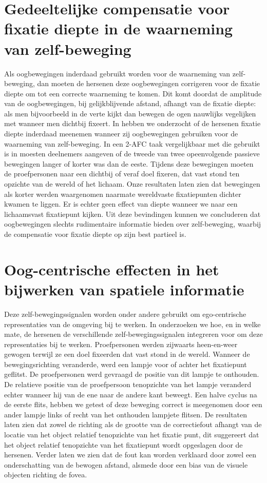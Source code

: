 \section{Gedeeltelijke compensatie voor fixatie diepte in de waarneming van zelf-beweging}
Als oogbewegingen inderdaad gebruikt worden voor de waarneming van zelf-beweging, dan moeten de hersenen deze oogbewegingen corrigeren voor de fixatie diepte om tot een correcte waarneming te komen. Dit komt doordat de amplitude van de oogbewegingen, bij gelijkblijvende afstand, afhangt van de fixatie diepte: als men bijvoorbeeld in de verte kijkt dan bewegen de ogen nauwlijks vegelijken met wanneer men dichtbij fixeert. In  hebben we onderzocht of de hersenen fixatie diepte inderdaad meenemen wanneer zij oogbewegingen gebruiken voor de waarneming van zelf-beweging. In een 2-AFC taak vergelijkbaar met die gebruikt is in  moesten deelnemers aangeven of de tweede van twee opeenvolgende passieve bewegingen langer of korter was dan de eeste. Tijdens deze bewegingen moeten de proefpersonen naar een dichtbij of veraf doel fixeren, dat vast stond ten opzichte van de wereld of het lichaam. Onze resultaten laten zien dat bewegingen als korter werden waargenomen naarmate wereldvaste fixatiepunten dichter kwamen te liggen. Er is echter geen effect van diepte wanneer we naar een lichaamsvast fixatiepunt kijken. Uit deze bevindingen kunnen we concluderen dat oogbewegingen slechts rudimentaire informatie bieden over zelf-beweging, waarbij de compensatie voor fixatie diepte op zijn best partieel is.

\section{Oog-centrische effecten in het bijwerken van spatiele informatie}
Deze zelf-bewegingssignalen worden onder andere gebruikt om ego-centrische representaties van de omgeving bij te werken. In  onderzoeken we hoe, en in welke mate, de hersenen de verschillende zelf-bewegingssignalen integreren voor om deze representaties bij te werken. Proefpersonen werden zijwaarts heen-en-weer gewogen terwijl ze een doel fixeerden dat vast stond in de wereld. Wanneer de bewegingsrichting veranderde, werd een lampje voor of achter het fixatiepunt geflitst. De proefpersonen werd gevraagd de positie van dit lampje te onthouden. De relatieve positie van de proefpersoon tenopzichte van het lampje veranderd echter wanneer hij van de ene naar de andere kant beweegt. Een halve cyclus na de eerste flits, hebben we getest of deze beweging correct is meegenomen door een ander lampje links of recht van het onthouden lampjete flitsen. De resultaten laten zien dat zowel de richting als de grootte van de correctiefout afhangt van de locatie van het object relatief tenopzichte van het fixatie punt, dit suggereert dat het object relatief tenopzichte van het fixatiepunt wordt opgeslagen door de hersenen. Verder laten we zien dat de fout kan worden verklaard door zowel een onderschatting van de bewogen afstand, alsmede door een bias van de visuele objecten richting de fovea.

